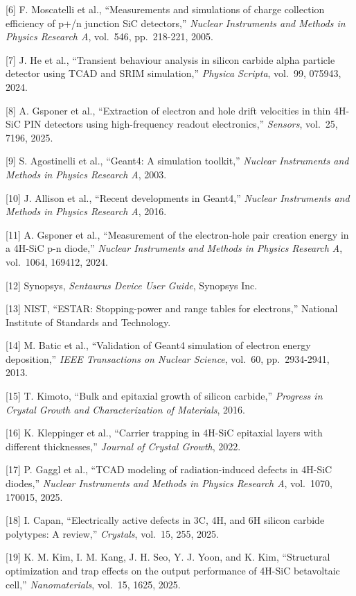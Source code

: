\documentclass[
  10pt,
  a4paper,
]{ctexart}
\begin{document}
{[}6{]} F. Moscatelli et al., ``Measurements and simulations of charge
collection efficiency of p+/n junction SiC detectors,'' \emph{Nuclear
Instruments and Methods in Physics Research A}, vol.~546, pp.~218-221,
2005.

{[}7{]} J. He et al., ``Transient behaviour analysis in silicon carbide
alpha particle detector using TCAD and SRIM simulation,'' \emph{Physica
Scripta}, vol.~99, 075943, 2024.

{[}8{]} A. Gsponer et al., ``Extraction of electron and hole drift
velocities in thin 4H-SiC PIN detectors using high-frequency readout
electronics,'' \emph{Sensors}, vol.~25, 7196, 2025.

{[}9{]} S. Agostinelli et al., ``Geant4: A simulation toolkit,''
\emph{Nuclear Instruments and Methods in Physics Research A}, 2003.

{[}10{]} J. Allison et al., ``Recent developments in Geant4,''
\emph{Nuclear Instruments and Methods in Physics Research A}, 2016.

{[}11{]} A. Gsponer et al., ``Measurement of the electron-hole pair
creation energy in a 4H-SiC p-n diode,'' \emph{Nuclear Instruments and
Methods in Physics Research A}, vol.~1064, 169412, 2024.

{[}12{]} Synopsys, \emph{Sentaurus Device User Guide}, Synopsys Inc.

{[}13{]} NIST, ``ESTAR: Stopping-power and range tables for electrons,''
National Institute of Standards and Technology.

{[}14{]} M. Batic et al., ``Validation of Geant4 simulation of electron
energy deposition,'' \emph{IEEE Transactions on Nuclear Science},
vol.~60, pp.~2934-2941, 2013.

{[}15{]} T. Kimoto, ``Bulk and epitaxial growth of silicon carbide,''
\emph{Progress in Crystal Growth and Characterization of Materials},
2016.

{[}16{]} K. Kleppinger et al., ``Carrier trapping in 4H-SiC epitaxial
layers with different thicknesses,'' \emph{Journal of Crystal Growth},
2022.

{[}17{]} P. Gaggl et al., ``TCAD modeling of radiation-induced defects
in 4H-SiC diodes,'' \emph{Nuclear Instruments and Methods in Physics
Research A}, vol.~1070, 170015, 2025.

{[}18{]} I. Capan, ``Electrically active defects in 3C, 4H, and 6H
silicon carbide polytypes: A review,'' \emph{Crystals}, vol.~15, 255,
2025.

{[}19{]} K. M. Kim, I. M. Kang, J. H. Seo, Y. J. Yoon, and K. Kim,
``Structural optimization and trap effects on the output performance of
4H-SiC betavoltaic cell,'' \emph{Nanomaterials}, vol.~15, 1625, 2025.
\end{document}
